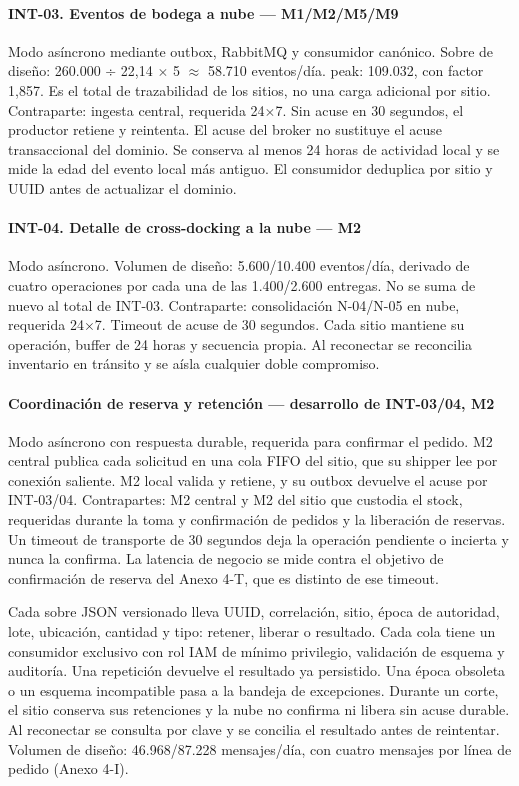 \paragraph{INT-03. Eventos de bodega a nube — M1/M2/M5/M9}
Modo asíncrono mediante outbox, RabbitMQ y consumidor canónico. Sobre de diseño: 260.000 ÷ 22,14 $\times$ 5 $\approx$ 58.710 eventos/día. peak: 109.032, con factor 1,857. Es el total de trazabilidad de los sitios, no una carga adicional por sitio. Contraparte: ingesta central, requerida 24$\times$7. Sin acuse en 30 segundos, el productor retiene y reintenta. El acuse del broker no sustituye el acuse transaccional del dominio. Se conserva al menos 24 horas de actividad local y se mide la edad del evento local más antiguo. El consumidor deduplica por sitio y UUID antes de actualizar el dominio.

\paragraph{INT-04. Detalle de cross-docking a la nube — M2}
Modo asíncrono. Volumen de diseño: 5.600/10.400 eventos/día, derivado de cuatro operaciones por cada una de las 1.400/2.600 entregas. No se suma de nuevo al total de INT-03. Contraparte: consolidación N-04/N-05 en nube, requerida 24$\times$7. Timeout de acuse de 30 segundos. Cada sitio mantiene su operación, buffer de 24 horas y secuencia propia. Al reconectar se reconcilia inventario en tránsito y se aísla cualquier doble compromiso.

\paragraph{Coordinación de reserva y retención — desarrollo de INT-03/04, M2}
Modo asíncrono con respuesta durable, requerida para confirmar el pedido. M2 central publica cada solicitud en una cola FIFO del sitio, que su shipper lee por conexión saliente. M2 local valida y retiene, y su outbox devuelve el acuse por INT-03/04. Contrapartes: M2 central y M2 del sitio que custodia el stock, requeridas durante la toma y confirmación de pedidos y la liberación de reservas. Un timeout de transporte de 30 segundos deja la operación pendiente o incierta y nunca la confirma. La latencia de negocio se mide contra el objetivo de confirmación de reserva del Anexo 4-T, que es distinto de ese timeout.

Cada sobre JSON versionado lleva UUID, correlación, sitio, época de autoridad, lote, ubicación, cantidad y tipo: retener, liberar o resultado. Cada cola tiene un consumidor exclusivo con rol IAM de mínimo privilegio, validación de esquema y auditoría. Una repetición devuelve el resultado ya persistido. Una época obsoleta o un esquema incompatible pasa a la bandeja de excepciones. Durante un corte, el sitio conserva sus retenciones y la nube no confirma ni libera sin acuse durable. Al reconectar se consulta por clave y se concilia el resultado antes de reintentar. Volumen de diseño: 46.968/87.228 mensajes/día, con cuatro mensajes por línea de pedido (Anexo 4-I).


